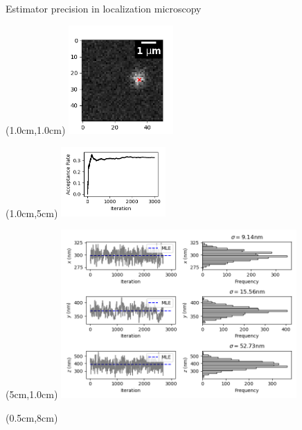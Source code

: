 \documentclass{beamer}					%
\begin{document}
\begin{frame}{Estimator precision in localization microscopy}
\begin{textblock*}{4cm}(1.0cm,1.0cm)
\includegraphics[width=4cm]{MCMC/Figure_1.png}
\end{textblock*}
\begin{textblock*}{4cm}(1.0cm,5cm)
\includegraphics[width=4cm]{MCMC/Figure_2.png}
\end{textblock*}
\begin{textblock*}{9cm}(5cm,1.0cm)
\includegraphics[width=9cm]{MCMC/Figure_3.png}
\end{textblock*}
\begin{textblock*}{13cm}(0.5cm,8cm)

\end{textblock*}
\end{frame}
\end{document}
